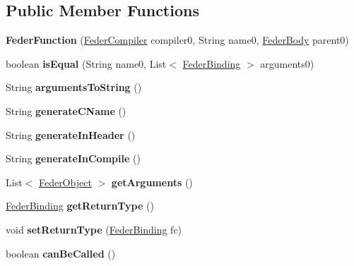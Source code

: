 \subsection*{Public Member Functions}
\begin{DoxyCompactItemize}
\item 
\mbox{\label{classfeder_1_1types_1_1FederFunction_a9e4e3582788c32d28af8b136e55ef278}} 
{\bfseries Feder\+Function} (\hyperlink{classfeder_1_1FederCompiler}{Feder\+Compiler} compiler0, String name0, \hyperlink{classfeder_1_1types_1_1FederBody}{Feder\+Body} parent0)
\item 
\mbox{\label{classfeder_1_1types_1_1FederFunction_a1767946984306366c14a5273f1c79df7}} 
boolean {\bfseries is\+Equal} (String name0, List$<$ \hyperlink{classfeder_1_1types_1_1FederBinding}{Feder\+Binding} $>$ arguments0)
\item 
\mbox{\label{classfeder_1_1types_1_1FederFunction_aa1004206bf0346be0667c92ead2e2937}} 
String {\bfseries arguments\+To\+String} ()
\item 
\mbox{\label{classfeder_1_1types_1_1FederFunction_a929142704124442b1823e03719b44158}} 
String {\bfseries generate\+C\+Name} ()
\item 
\mbox{\label{classfeder_1_1types_1_1FederFunction_aaff6b63ee9ee8fc5cdc90078e046e000}} 
String {\bfseries generate\+In\+Header} ()
\item 
\mbox{\label{classfeder_1_1types_1_1FederFunction_a24e7b0f6b7db8c7ea576a869b285aac4}} 
String {\bfseries generate\+In\+Compile} ()
\item 
\mbox{\label{classfeder_1_1types_1_1FederFunction_a0b6456af51aa6da02eccdce8332a1a05}} 
List$<$ \hyperlink{classfeder_1_1types_1_1FederObject}{Feder\+Object} $>$ {\bfseries get\+Arguments} ()
\item 
\mbox{\label{classfeder_1_1types_1_1FederFunction_a728b55a9b2aa8f8741583a02bf043652}} 
\hyperlink{classfeder_1_1types_1_1FederBinding}{Feder\+Binding} {\bfseries get\+Return\+Type} ()
\item 
\mbox{\label{classfeder_1_1types_1_1FederFunction_a7b7366dbf71b69616e2ea729c692df14}} 
void {\bfseries set\+Return\+Type} (\hyperlink{classfeder_1_1types_1_1FederBinding}{Feder\+Binding} fc)
\item 
\mbox{\label{classfeder_1_1types_1_1FederFunction_a2e3d1a5ca1516135c30ccca8afe65be2}} 
boolean {\bfseries can\+Be\+Called} ()
\end{DoxyCompactItemize}
